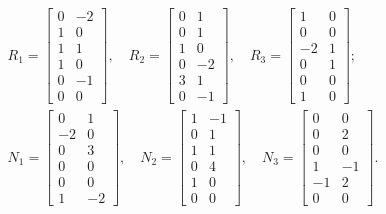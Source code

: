 \documentclass[11pt,reqno,oneside,a4paper]{article}
\theoremstyle{plain} %
\theoremstyle{definition}
\theoremstyle{remark}
\begin{document}
\begin{equation*}
\begin{aligned}
R_1 = \begin{bmatrix} 0 & -2 \\ 1 & 0 \\ 1 & 1 \\ 1 & 0 \\ 0 & -1 \\ 0 & 0 \end{bmatrix}, \quad R_2= \begin{bmatrix} 0 & 1  \\ 0 & 1 \\ 1 & 0 \\ 0 & -2 \\ 3 & 1 \\ 0 & -1 \end{bmatrix}, \quad R_3 = \begin{bmatrix} 1 & 0 \\ 0 & 0 \\ -2 & 1 \\ 0 & 1 \\ 0 & 0 \\ 1 & 0 \end{bmatrix}; \\
N_1 = \begin{bmatrix} 0 & 1 \\ -2 & 0 \\ 0 & 3 \\ 0 & 0 \\ 0 & 0 \\ 1 & -2 \end{bmatrix}, \quad N_2= \begin{bmatrix} 1 & -1  \\ 0 & 1 \\ 1 & 1 \\ 0 & 4 \\ 1 & 0 \\ 0 & 0 \end{bmatrix}, \quad N_3 = \begin{bmatrix} 0 & 0 \\ 0 & 2 \\ 0 & 0 \\ 1 & -1 \\ -1 & 2 \\ 0 & 0 \end{bmatrix}.
\end{aligned}
\end{equation*}
\end{document}
